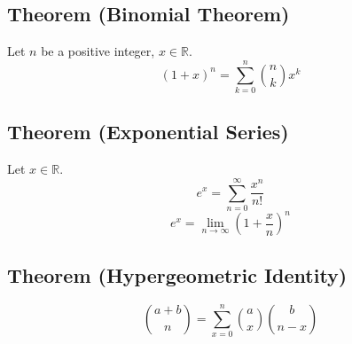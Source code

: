 \begin{thmbox}
    \subsection{Theorem (Binomial Theorem)}
    Let $ n $ be a positive integer, $ x\in\mathbb{R} $.
    \[ (1+x)^n=\sum\limits_{k=0}^{n} \binom{n}{k}x^k \]
\end{thmbox}

\begin{thmbox}
    \subsection{Theorem (Exponential Series)}
    Let $ x\in\mathbb{R} $.
    \[ e^x=\sum\limits_{n=0}^{\infty}\frac{x^n}{n!}  \]
    \[ e^x=\lim\limits_{{n} \to {\infty}} \left( 1+\frac{x}{n}  \right)^n \]
\end{thmbox}

\begin{thmbox}
    \subsection{Theorem (Hypergeometric Identity)}
    \[ \binom{a+b}{n}=\sum\limits_{x=0}^{n} \binom{a}{x}\binom{b}{n-x} \]
\end{thmbox}
